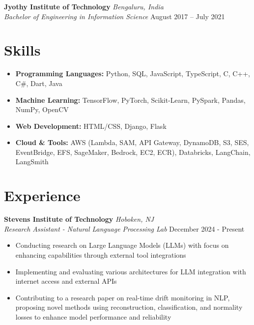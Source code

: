 \documentclass[11pt,a4paper]{article}
\begin{document}
\vspace{0.7em}
\noindent\textbf{Jyothy Institute of Technology} \hfill \textit{Bengaluru, India}\\
\textit{Bachelor of Engineering in Information Science} \hfill August 2017 – July 2021\\
\vspace{-0.5em}
\section*{Skills}
\begin{itemize}[noitemsep,topsep=2pt]
    \item \textbf{Programming Languages:} Python, SQL, JavaScript, TypeScript, C, C++, C\#, Dart, Java
    \item \textbf{Machine Learning:} TensorFlow, PyTorch, Scikit-Learn, PySpark, Pandas, NumPy, OpenCV
    \item \textbf{Web Development:} HTML/CSS, Django, Flask
    \item \textbf{Cloud \& Tools:} AWS (Lambda, SAM, API Gateway, DynamoDB, S3, SES, EventBridge, EFS, SageMaker, Bedrock, EC2, ECR), Databricks, LangChain, LangSmith
\end{itemize}

\section*{Experience}
\noindent\textbf{Stevens Institute of Technology} \hfill \textit{Hoboken, NJ}\\
\textit{Research Assistant - Natural Language Processing Lab} \hfill December 2024 - Present
\begin{itemize}[noitemsep,topsep=2pt]
    \item Conducting research on Large Language Models (LLMs) with focus on enhancing capabilities through external tool integrations
    \item Implementing and evaluating various architectures for LLM integration with internet access and external APIs
    \item Contributing to a research paper on real-time drift monitoring in NLP, proposing novel methods using reconstruction, classification, and normality losses to enhance model performance and reliability
\end{itemize}
\vspace{-0.3em}
\end{document}
